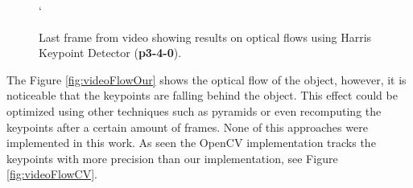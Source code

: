 \documentclass[12pt,a4paper]{article}
\begin{document}
\begin{figure}[!h]
	\centering
	`
	\enskip
	\caption{Last frame from video showing results on optical flows using Harris Keypoint Detector (\textbf{p3-4-0}).}
	\label{fig:flowVideo}
\end{figure}

The Figure \ref{fig:videoFlowOur} shows the optical flow of the object, however, it is noticeable that the keypoints are falling behind the object. This effect could be optimized using other techniques such as pyramids or even recomputing the keypoints after a certain amount of frames. None of this approaches were implemented in this work. As seen the OpenCV implementation tracks the keypoints with more precision than our implementation, see Figure \ref{fig:videoFlowCV}.  \\
\end{document}
